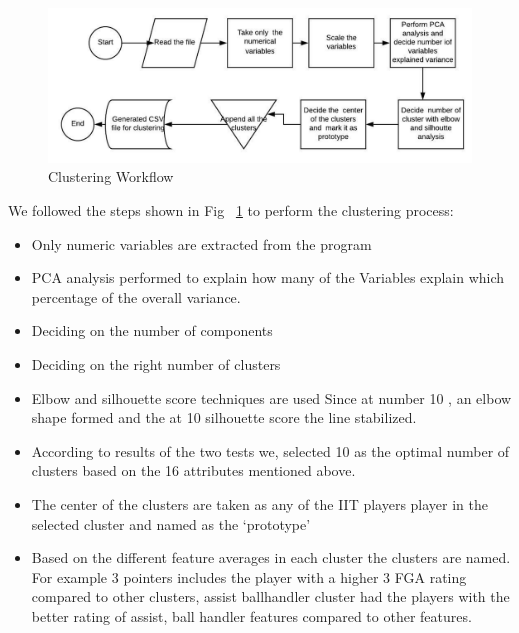 \documentclass[conference]{IEEEtran}
\begin{document}
 

\begin{figure}[H]   
    \includegraphics[scale=0.2]{clustering.jpg}
    \caption{Clustering Workflow}
    \label{Clustering Flow}
\end{figure}

We followed the steps shown in Fig ~\ref{Clustering Flow} to perform the clustering process: 
\begin{itemize}
\item Only numeric variables are extracted from the program
\item PCA analysis performed to explain how many of the Variables explain which percentage of the
overall variance. 
\item Deciding on the number of components
\item Deciding on the right number of clusters
\item Elbow and silhouette score techniques are used 
Since at number 10 , an elbow shape formed and the at 10 silhouette score the line stabilized. 
\item According to results of the two tests we, selected 10 as the optimal number of clusters based on the 16 attributes mentioned above. 
\item The center of the clusters are taken as any of the IIT players player in the selected cluster and named as the ‘prototype’ 
\item Based on the different feature averages in each cluster the clusters are named. For example 3 pointers includes the player with a higher 3 FGA rating compared to other 
clusters, assist ballhandler cluster had the players with the better rating of assist, ball handler features compared to other features. 
\end{itemize}
\end{document}
